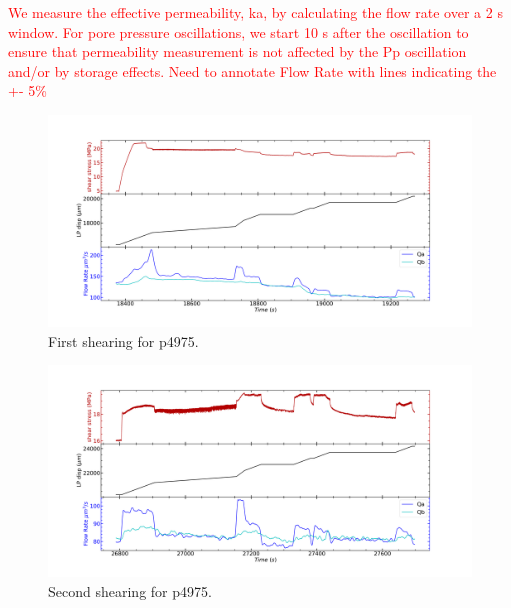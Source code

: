 \documentclass[letterpaper,10pt]{article}
\begin{document}
\textcolor{red}{We measure the effective permeability, ka, by calculating the flow rate over a 2 s window. For pore pressure oscillations, we start 10 s after the oscillation to ensure that permeability measurement is not affected by the Pp oscillation and/or by storage effects. Need to annotate Flow Rate with lines indicating the +- 5\%}

\newpage


%
%

\newpage

\begin{figure}[ht]
	\centering
	\includegraphics[width=1\columnwidth]{Shearing_p4975_shr1}
	\caption{First shearing for p4975.}
	\label{fig:shr1_p4975}
\end{figure}

\newpage

\begin{figure}[ht]
	\centering
	\includegraphics[width=1\columnwidth]{Shearing_p4975_shr2}
	\caption{Second shearing for p4975.}
	\label{fig:shr2_p4975}
\end{figure}
\end{document}
